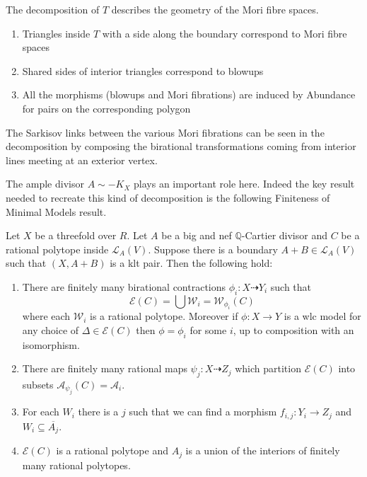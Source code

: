 \documentclass[a4paper,12pt]{book}
\begin{document}
	The decomposition of $T$ describes the geometry of the Mori fibre spaces.
	\begin{enumerate}
		\item Triangles inside $T$ with a side along the boundary correspond to Mori fibre spaces
		\item Shared sides of interior triangles correspond to blowups
		\item All the morphisms (blowups and Mori fibrations) are induced by Abundance for pairs on the corresponding polygon
	\end{enumerate}

	The Sarkisov links between the various Mori fibrations can be seen in the decomposition by composing the birational transformations coming from interior lines meeting at an exterior vertex.

	The ample divisor $A\sim -K_{X}$ plays an important role here. Indeed the key result needed to recreate this kind of decomposition is the following Finiteness of Minimal Models result.
	
	\begin{theo}\label{Main_Finite2}
		Let $X$ be a threefold over $R$. Let $A$ be a big and nef $\mathbb{Q}$-Cartier divisor and $C$ be a rational polytope inside $\mathcal{L}_{A}(V)$. Suppose there is a boundary $A+B \in \mathcal{L}_{A}(V)$ such that $(X,A+B)$ is a klt pair. Then the following hold:
		
		\begin{enumerate}
			\item There are finitely many birational contractions $\phi_{i}:X \dashrightarrow Y_{i}$ such that 
			\[\mathcal{E}(C) = \bigcup \mathcal{W}_{i}=\mathcal{W}_{\phi_{i}}(C)\]
			where each $\mathcal{W}_{i}$ is a rational polytope. Moreover if $\phi:X \to Y$ is a wlc model for any choice of $\Delta \in \mathcal{E}(C)$ then $\phi=\phi_{i}$ for some $i$, up to composition with an isomorphism.
			
			\item There are finitely many rational maps $\psi_{j}:X \dashrightarrow Z_{j}$ which partition $\mathcal{E}(C)$ into subsets $\mathcal{A}_{\psi_{j}}(C)=\mathcal{A}_{i}$.
			\item  For each $W_{i}$ there is a $j$ such that we can find a morphism $f_{i,j}: Y_{i} \to Z_{j}$ and $W_{i} \subseteq \overline{A_{j}}$.
			\item  $\mathcal{E}(C)$ is a rational polytope and $A_{j}$ is a union of the interiors of finitely many rational polytopes.
		\end{enumerate}
	\end{theo}
	
\end{document}
